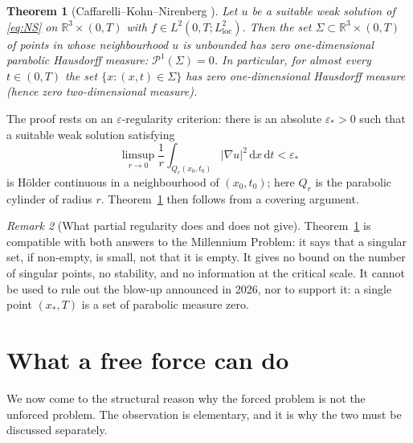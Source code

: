 \documentclass[11pt]{article}
\newtheorem{theorem}{Theorem}[section]
\theoremstyle{remark}
\newtheorem{remark}[theorem]{Remark}
\newcommand{\R}{\mathbb{R}}
\newcommand{\eps}{\varepsilon}
\newcommand{\dd}{\,\mathrm{d}}
\newcommand{\abs}[1]{\lvert #1\rvert}
\begin{document}
\begin{theorem}[Caffarelli--Kohn--Nirenberg {\rm\cite{CKN1982}}]\label{thm:CKN}
Let $u$ be a suitable weak solution of \eqref{eq:NS} on $\R^3\times(0,T)$ with
$f\in L^2(0,T;L^2_{\mathrm{loc}})$. Then the set $\Sigma\subset\R^3\times(0,T)$ of points in
whose neighbourhood $u$ is unbounded has zero one-dimensional parabolic Hausdorff measure:
$\mathcal{P}^1(\Sigma)=0$. In particular, for almost every $t\in(0,T)$ the set
$\{x:(x,t)\in\Sigma\}$ has zero one-dimensional Hausdorff measure (hence zero
two-dimensional measure).
\end{theorem}

The proof rests on an $\eps$-regularity criterion: there is an absolute $\eps_*>0$ such that a
suitable weak solution satisfying
\[
\limsup_{r\to0}\frac1r\int_{Q_r(x_0,t_0)}\abs{\nabla u}^2\dd x\dd t<\eps_*
\]
is H\"older continuous in a neighbourhood of $(x_0,t_0)$; here $Q_r$ is the parabolic
cylinder of radius $r$. Theorem~\ref{thm:CKN} then follows from a covering argument.

\begin{remark}[What partial regularity does and does not give]\label{rem:CKN}
Theorem~\ref{thm:CKN} is compatible with both answers to the Millennium Problem: it says that
a singular set, if non-empty, is small, not that it is empty. It gives no bound on the number
of singular points, no stability, and no information at the critical scale. It cannot be used
to rule out the blow-up announced in 2026, nor to support it: a single point $(x_*,T)$ is a set
of parabolic measure zero.
\end{remark}

\section{What a free force can do}\label{sec:prescription}

We now come to the structural reason why the forced problem is not the unforced problem. The
observation is elementary, and it is why the two must be discussed separately.
\end{document}
